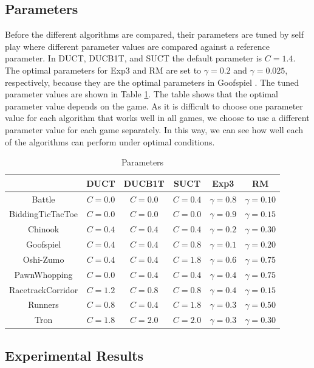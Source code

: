 \documentclass[conference]{IEEEtran}
\begin{document}
\subsection{Parameters}
Before the different algorithms are compared, their parameters are tuned by self play where different parameter values are compared against a reference parameter. In DUCT, DUCB1T, and SUCT the default parameter is $C=1.4$. The optimal parameters for Exp3 and RM are set to $\gamma = 0.2$ and $\gamma = 0.025$, respectively, because they are the optimal parameters in Goofspiel \cite{Lanctot13Goofspiel}. The tuned parameter values are shown in Table \ref{table:parameters}. The table shows that the optimal parameter value depends on the game. As it is difficult to choose one parameter value for each algorithm that works well in all games, we choose to use a different parameter value for each game separately. In this way, we can see how well each of the algorithms can perform under optimal conditions.
\begin{table}[h]
\caption{Parameters}
\label{table:parameters}
\centering
\begin{tabular}{|c|c|c|c|c|c|}
\hline
  & DUCT & DUCB1T & SUCT & Exp3 & RM  \\
\hline
Battle & $C=0.0$ & $C=0.0$ & $C=0.4$ & $\gamma = 0.8$ & $\gamma = 0.10$  \\ 
BiddingTicTacToe & $C=0.0$ & $C=0.0$ & $C=0.0$ & $\gamma = 0.9$ & $\gamma = 0.15$   \\ 
Chinook & $C=0.4$ & $C=0.4$ & $C=0.4$ & $\gamma = 0.2$ & $\gamma = 0.30$ \\ 
Goofspiel & $C=0.4$ & $C=0.4$ & $C=0.8$ & $\gamma = 0.1$ & $\gamma = 0.20$ \\ 
Oshi-Zumo & $C=0.4$ & $C=0.4$ & $C=1.8$ & $\gamma = 0.6$ & $\gamma = 0.75$ \\ 
PawnWhopping & $C=0.0$ & $C=0.4$ & $C=0.4$ & $\gamma = 0.4$ & $\gamma = 0.75$  \\ 
RacetrackCorridor & $C=1.2$ & $C=0.8$ & $C=0.8$ & $\gamma = 0.4$ & $\gamma = 0.15$\\ 
Runners & $C=0.8$ & $C=0.4$ & $C=1.8$ & $\gamma = 0.3$ & $\gamma = 0.50$ \\
Tron & $C=1.8$ & $C=2.0$ & $C=2.0$ & $\gamma = 0.3$ & $\gamma = 0.30$ \\
 \hline
\end{tabular}
\end{table}

\subsection{Experimental Results}
\label{subsec:results}
\end{document}
